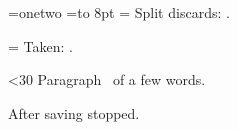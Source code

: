 \documentclass{article}
\begin{document}
\newbox\col
\setbox\col=\vbox{\hbox{one}\kern 2pt\hbox{two}}
=\vsplit\col to 8pt
\setbox\disc=\vbox{\splitdiscards}
Split discards: \the\ht\disc.\par
\setbox\disc=\vbox{\splitdiscards}
Taken: \the\ht\disc.\par
\newcount\n
\loop\ifnum\n<30 \advance{}
  Paragraph \the\n\ of a few words.\par
  \ifnum{} \vskip 7pt \kern 5pt\fi
\repeat
{}
 \vskip 13pt
After saving stopped.
\end{document}
